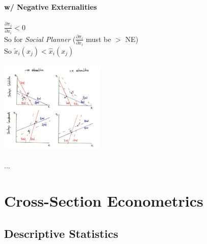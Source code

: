 \documentclass[11pt, english]{article}
\begin{document}
		\paragraph{w/ Negative Externalities}
	
	$\frac{\partial \pi_j}{\partial x_i}<0$\\           
        So for \textit{Social Planner} ($\frac{\partial \pi_i}{\partial x_i}$ must be $>$ NE)\\
        So ${\widetilde{x}}_i\left(x_j\right)<{\hat{x}}_i\left(x_j\right)$

	\begin{center}
		\includegraphics[width=5cm,height=4.5cm]{EC315-IMG/21.png}
	\end{center}

\newpage

...

\newpage

\section{Cross-Section Econometrics}

	\subsection{Descriptive Statistics}
\end{document}
